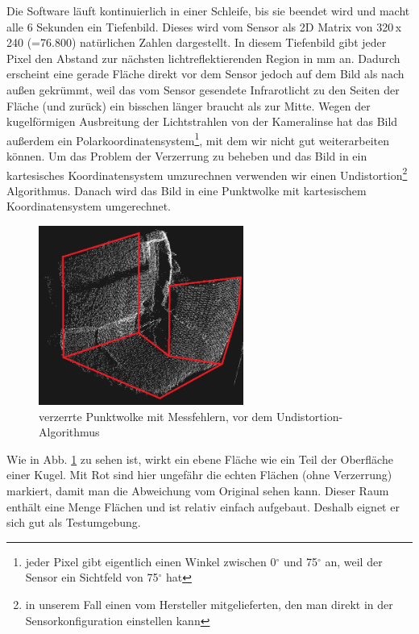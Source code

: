 \documentclass[a4paper,12pt,ngerman]{scrartcl}
\begin{document}
Die Software läuft kontinuierlich in einer Schleife, bis sie beendet wird und macht alle 6 Sekunden ein 
Tiefenbild. Dieses wird vom Sensor als 2D Matrix von 320$\,$x$\,$240 (=76.800) natürlichen Zahlen dargestellt.
In diesem Tiefenbild gibt jeder Pixel den Abstand zur nächsten lichtreflektierenden Region in mm an. 
Dadurch erscheint eine gerade Fläche direkt vor dem Sensor jedoch auf dem Bild als nach außen gekrümmt, 
weil das vom Sensor gesendete Infrarotlicht zu den Seiten der Fläche (und zurück) ein bisschen länger
braucht als zur Mitte. Wegen der kugelförmigen Ausbreitung der Lichtstrahlen von der Kameralinse hat das
Bild außerdem ein Polarkoordinatensystem\footnote{jeder Pixel gibt eigentlich einen Winkel zwischen
	0$^{\circ}$ und 75$^{\circ}$ an, weil der Sensor ein Sichtfeld von 75$^{\circ}$ hat}, mit dem wir nicht
gut weiterarbeiten können. Um das Problem der Verzerrung zu beheben und das Bild in ein kartesisches
Koordinatensystem umzurechnen verwenden wir einen Undistortion\footnote{in unserem Fall einen
	vom Hersteller mitgelieferten, den man direkt in der Sensorkonfiguration einstellen kann} Algorithmus. Danach wird das Bild in eine Punktwolke mit kartesischem Koordinatensystem umgerechnet.\par
\begin{figure}[H] \label{distorted_pointcloud_img}
	\centering
	\includegraphics[width=0.6\textwidth]{no_undistortion2}
	\caption{verzerrte Punktwolke mit Messfehlern, vor dem Undistortion-Algorithmus}
\end{figure}
Wie in Abb. \ref{distorted_pointcloud_img} zu sehen ist, wirkt ein ebene Fläche wie ein Teil der Oberfläche einer Kugel. Mit Rot sind hier ungefähr die echten Flächen (ohne Verzerrung) markiert, damit man die 
Abweichung vom Original sehen kann. Dieser Raum enthält eine Menge 
Flächen und ist relativ einfach aufgebaut. Deshalb eignet er sich gut als Testumgebung.
\end{document}
